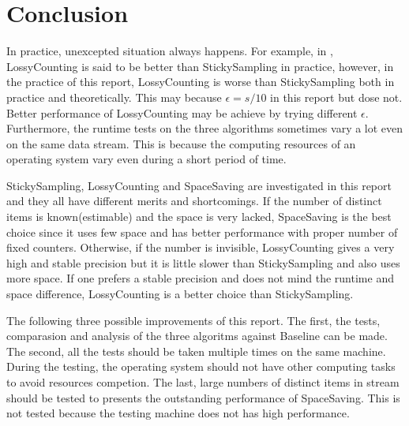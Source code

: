 \documentclass[10pt]{article}
\begin{document}
 \section{Conclusion}\label{conclusion}
 In practice, unexcepted situation always happens. 
 For example, in \cite{stickylossy}, LossyCounting is said to be better than StickySampling in practice,
 however, in the practice of this report, LossyCounting is worse than StickySampling both in practice and theoretically.
 This may because $\epsilon{} = s/10$ in this report but \cite{stickylossy} dose not. 
 Better performance of LossyCounting may be achieve by trying different $\epsilon$.
 Furthermore, the runtime tests on the three algorithms sometimes vary a lot even on the same data stream.
 This is because the computing resources of an operating system vary even during a short period of time.

 StickySampling, LossyCounting and SpaceSaving are investigated in this report and
 they all have different merits and shortcomings. 
 If the number of distinct items is known(estimable) and the space is very lacked,
 SpaceSaving is the best choice since it uses few space and has better performance with proper number of fixed counters.
 Otherwise, if the number is invisible, LossyCounting gives a very high and stable precision but it is little slower 
 than StickySampling and also uses more space. If one prefers a stable precision and 
 does not mind the runtime and space difference, LossyCounting is a better choice than StickySampling.

 The following three possible improvements of this report. 
 The first, the tests, comparasion and analysis of the three algoritms against 
 Baseline can be made.
 The second, all the tests should be taken multiple times on the same machine.
 During the testing, the operating system should not have other computing tasks to avoid resources competion.
 The last, large numbers of distinct items in stream should be tested to presents the 
 outstanding performance of SpaceSaving. This is not tested because the testing machine does not has high performance.
  
 \clearpage


\end{document}
